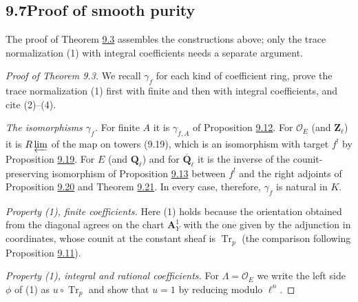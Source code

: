 \documentclass[11pt]{article}
\begin{document}
\subsection*{\texorpdfstring{9.7\quad Proof of smooth purity}{9.7 Proof of smooth purity}}
\label{bp94}%
\label{bp95}%
The proof of Theorem \hyperref[bp11]{9.3} assembles the constructions above; only the trace normalization (1) with integral coefficients needs a separate argument.

\begin{proof}[{Proof of Theorem 9.3}]\label{bp96}%
We recall \(\gamma_f\) for each kind of coefficient ring, prove the trace normalization (1) first with finite and then with integral coefficients, and cite (2)–(4).

\emph{The isomorphisms \(\gamma_f\).} For finite \(A\) it is \(\gamma_{f,A}\) of Proposition \hyperref[bp39]{9.12}. For \(\mathcal O_E\) (and \(\mathbf Z_\ell\)) it is \(R\varprojlim\) of the map on towers (9.19), which is an isomorphism with target \(f^!\) by Proposition \hyperref[bp63]{9.19}. For \(E\) (and \(\mathbf Q_\ell\)) and for \(\overline{\mathbf Q}_\ell\) it is the inverse of the counit-preserving isomorphism of Proposition \hyperref[bp43]{9.13} between \(f^!\) and the right adjoints of Proposition \hyperref[bp68]{9.20} and Theorem \hyperref[bp71]{9.21}. In every case, therefore, \(\gamma_f\) is natural in \(K\).

\emph{Property (1), finite coefficients.} Here (1) holds because the orientation obtained from the diagonal agrees on the chart \(\mathbf A^1_Y\) with the one given by the adjunction in coordinates, whose counit at the constant sheaf is \(\operatorname{Tr}_p\) (the comparison following Proposition \hyperref[bp36]{9.11}).

\emph{Property (1), integral and rational coefficients.} For \(\Lambda=\mathcal O_E\) we write the left side \(\phi\) of (1) as \(u\circ\operatorname{Tr}_p\) and show that \(u=1\) by reducing modulo \(\ell^n\).


\end{proof}
\end{document}
